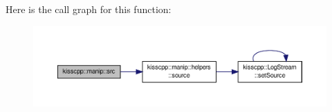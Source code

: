 Here is the call graph for this function\-:
\nopagebreak
\begin{figure}[H]
\begin{center}
\leavevmode
\includegraphics[width=350pt]{namespacekisscpp_1_1manip_a0660364105e23b9121ecf3d6d19858a5_cgraph}
\end{center}
\end{figure}


